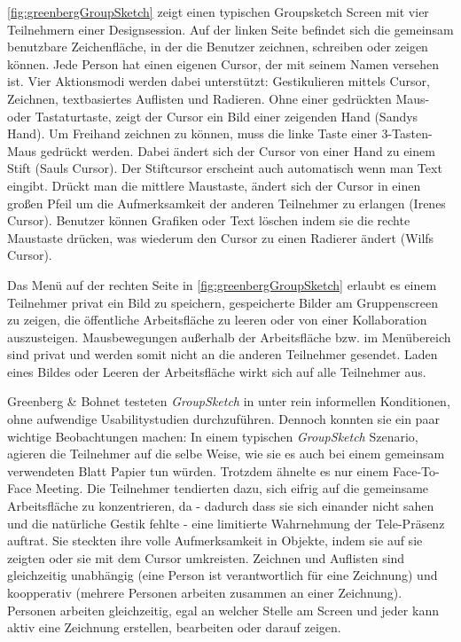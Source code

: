 \autoref{fig:greenbergGroupSketch} zeigt einen typischen Groupsketch Screen mit vier Teilnehmern einer Designsession. Auf der linken Seite befindet sich die gemeinsam benutzbare Zeichenfläche, in der die Benutzer zeichnen, schreiben oder zeigen können. Jede Person hat einen eigenen Cursor, der mit seinem Namen versehen ist. 
Vier Aktionsmodi werden dabei unterstützt: Gestikulieren mittels Cursor, Zeichnen, textbasiertes Auflisten und Radieren. Ohne einer gedrückten Maus- oder Tastaturtaste, zeigt der Cursor ein Bild einer zeigenden Hand (Sandys Hand). Um Freihand zeichnen zu können, muss die linke Taste einer 3-Tasten-Maus gedrückt werden. Dabei ändert sich der Cursor von einer Hand zu einem Stift (Sauls Cursor). Der Stiftcursor erscheint auch automatisch wenn man Text eingibt. Drückt man die mittlere Maustaste, ändert sich der Cursor in einen großen Pfeil um die Aufmerksamkeit der anderen Teilnehmer zu erlangen (Irenes Cursor). Benutzer können Grafiken oder Text löschen indem sie die rechte Maustaste drücken, was wiederum den Cursor zu einen Radierer ändert (Wilfs Cursor).

\medskip Das Menü auf der rechten Seite in \autoref{fig:greenbergGroupSketch} erlaubt es einem Teilnehmer privat ein Bild zu speichern, gespeicherte Bilder am Gruppenscreen zu zeigen, die öffentliche Arbeitsfläche zu leeren oder von einer Kollaboration auszusteigen. Mausbewegungen außerhalb der Arbeitsfläche bzw. im Menübereich sind privat und werden somit nicht an die anderen Teilnehmer gesendet. Laden eines Bildes oder Leeren der Arbeitsfläche wirkt sich auf alle Teilnehmer aus.

\medskip Greenberg \& Bohnet testeten \emph{GroupSketch} in \citep{Greenberg:1991} unter rein informellen Konditionen, ohne aufwendige Usabilitystudien durchzuführen. Dennoch konnten sie ein paar wichtige Beobachtungen machen: In einem typischen \emph{GroupSketch} Szenario, agieren die Teilnehmer auf die selbe Weise, wie sie es auch bei einem gemeinsam verwendeten Blatt Papier tun würden. Trotzdem ähnelte es nur einem Face-To-Face Meeting. Die Teilnehmer tendierten dazu, sich eifrig auf die gemeinsame Arbeitsfläche zu konzentrieren, da - dadurch dass sie sich einander nicht sahen und die natürliche Gestik fehlte - eine limitierte Wahrnehmung der Tele-Präsenz auftrat. Sie steckten ihre volle Aufmerksamkeit in Objekte, indem sie auf sie zeigten oder sie mit dem Cursor umkreisten. 
Zeichnen und Auflisten sind gleichzeitig unabhängig (eine Person ist verantwortlich für eine Zeichnung) und koopperativ (mehrere Personen arbeiten zusammen an einer Zeichnung). Personen arbeiten gleichzeitig, egal an welcher Stelle am Screen und jeder kann aktiv eine Zeichnung erstellen, bearbeiten oder darauf zeigen. 

